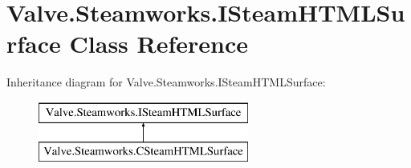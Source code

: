 \hypertarget{classValve_1_1Steamworks_1_1ISteamHTMLSurface}{}\section{Valve.\+Steamworks.\+I\+Steam\+H\+T\+M\+L\+Surface Class Reference}
\label{classValve_1_1Steamworks_1_1ISteamHTMLSurface}
Inheritance diagram for Valve.\+Steamworks.\+I\+Steam\+H\+T\+M\+L\+Surface\+:\begin{figure}[H]
\begin{center}
\leavevmode
\includegraphics[height=2.000000cm]{classValve_1_1Steamworks_1_1ISteamHTMLSurface}
\end{center}
\end{figure}
